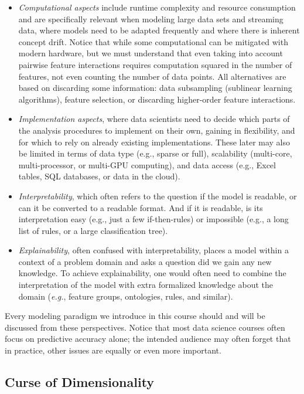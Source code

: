 \begin{refsection}
\begin{itemize}
\item {\em Computational aspects} include runtime complexity and resource consumption and are specifically relevant when modeling large data sets and streaming data, where models need to be adapted frequently and where there is inherent concept drift. Notice that while some computational can be mitigated with modern hardware, but we must understand that even taking into account pairwise feature interactions requires computation squared in the number of features, not even counting the number of data points. All alternatives are based on discarding some information: data subsampling (sublinear learning algorithms), feature selection, or discarding higher-order feature interactions.
\item {\em Implementation aspects}, where data scientists need to decide which parts of the analysis procedures to implement on their own, gaining in flexibility, and for which to rely on already existing implementations. These later may also be limited in terms of data type (e.g., sparse or full), scalability (multi-core, multi-processor, or multi-GPU computing), and data access (e.g., Excel tables, SQL databases, or data in the cloud).
\item {\em Interpretability}, which often refers to the question if the model is readable, or can it be converted to a readable format. And if it is readable, is its interpretation easy (e.g., just a few if-then-rules) or impossible (e.g., a long list of rules, or a large classification tree).
\item {\em Explainability}, often confused with interpretability, places a model within a context of a problem domain and asks a question did we gain any new knowledge. To achieve explainability, one would often need to combine the interpretation of the model with extra formalized knowledge about the domain ({\em e.g.}, feature groups, ontologies, rules, and similar).
\end{itemize}

Every modeling paradigm we introduce in this course should and will be discussed from these perspectives. Notice that most data science courses often focus on predictive accuracy alone; the intended audience may often forget that in practice, other issues are equally or even more important.

\subsection{Curse of Dimensionality}


\end{refsection}

